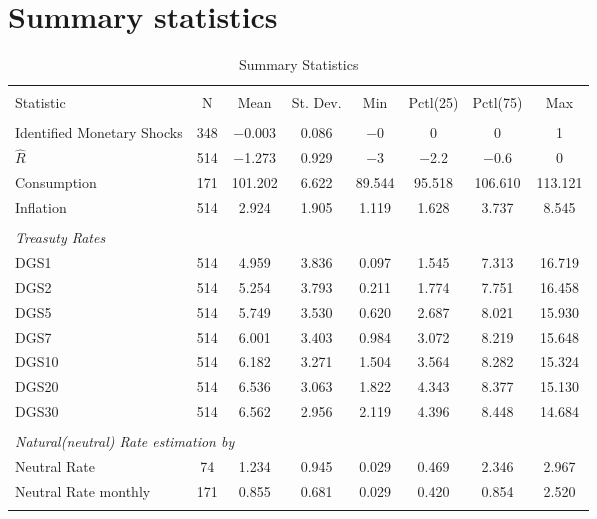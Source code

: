\documentclass[12pt]{article}
\begin{document}
\section{Summary statistics}
\label{sec:SummaryStatistics}
\begin{table}[!h]
    \begin{threeparttable}[t]
    \caption{ Summary Statistics} 
    \label{tab:Summary} 
    \footnotesize
    \begin{tabular}{@{\extracolsep{5pt}}lccccccc} 
        \\[-1.8ex]\hline 
        \hline \\[-1.8ex] 
        Statistic & \multicolumn{1}{c}{N} & \multicolumn{1}{c}{Mean} & \multicolumn{1}{c}{St. Dev.} & \multicolumn{1}{c}{Min} & \multicolumn{1}{c}{Pctl(25)} & \multicolumn{1}{c}{Pctl(75)} & \multicolumn{1}{c}{Max} \\ 
        \hline \\[-1.8ex] 
        Identified Monetary Shocks\tnote{a} & 348 & $-$0.003 & 0.086 & $-$0 & 0 & 0 & 1 \\
        $\hat{R}$ & 514 & $-$1.273 & 0.929 & $-$3 & $-$2.2 & $-$0.6 & 0 \\ 
        Consumption & 171 & 101.202 & 6.622 & 89.544 & 95.518 & 106.610 & 113.121 \\ 
        Inflation\tnote{b} & 514 & 2.924 & 1.905 & 1.119 & 1.628 & 3.737 & 8.545 \\ 
        \\
        \multicolumn{8}{l}{\textit{Treasuty Rates}}\\
        DGS1 & 514 & 4.959 & 3.836 & 0.097 & 1.545 & 7.313 & 16.719 \\ 
        DGS2 & 514 & 5.254 & 3.793 & 0.211 & 1.774 & 7.751 & 16.458 \\ 
        DGS5 & 514 & 5.749 & 3.530 & 0.620 & 2.687 & 8.021 & 15.930 \\ 
        DGS7 & 514 & 6.001 & 3.403 & 0.984 & 3.072 & 8.219 & 15.648 \\ 
        DGS10 & 514 & 6.182 & 3.271 & 1.504 & 3.564 & 8.282 & 15.324 \\ 
        DGS20 & 514 & 6.536 & 3.063 & 1.822 & 4.343 & 8.377 & 15.130 \\ 
        DGS30 & 514 & 6.562 & 2.956 & 2.119 & 4.396 & 8.448 & 14.684 \\ 
        \\
        \multicolumn{8}{l}{\textit{Natural(neutral) Rate estimation by \citet{HLW2017}}}\\
        Neutral Rate& 74 & 1.234 & 0.945 & 0.029 & 0.469 & 2.346 & 2.967 \\ 
        Neutral Rate monthly & 171 & 0.855 & 0.681 & 0.029 & 0.420 & 0.854 & 2.520 \\ 
        \\


\end{tabular}
\end{threeparttable}
\end{table}
\end{document}
